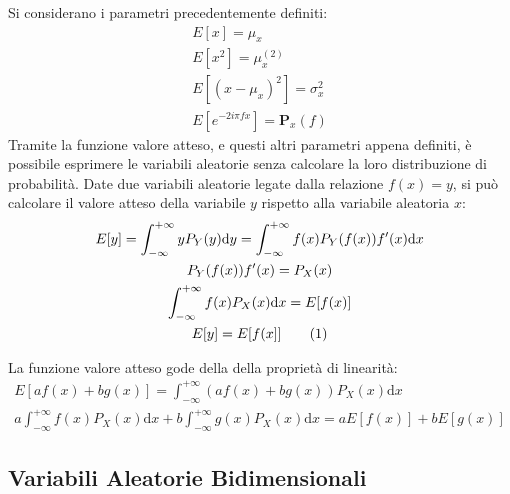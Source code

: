 \documentclass{article}
\newcommand{\df}{\mathrm{d}}
\newcommand{\tageq}{\tag{\stepcounter{equation}\theequation}}
\numberwithin{equation}{subsection}
\begin{document}
Si considerano i parametri precedentemente definiti:
\begin{gather*}
    E[x]=\mu_x\\
    E[x^2]=\mu_x^{(2)}\\
    E[(x-\mu_x)^2]=\sigma_x^2\\
    E\left[e^{-2i\pi fx}\right]=\mathbf{P}_x(f)
\end{gather*}
Tramite la funzione valore atteso, e questi altri parametri appena definiti, è possibile esprimere le variabili aleatorie senza calcolare la loro distribuzione 
di probabilità. Date due variabili aleatorie legate dalla 
relazione $f(x)=y$, si può calcolare il valore atteso della variabile $y$ rispetto alla variabile aleatoria $x$:
\begin{gather*}
    E[y]=\displaystyle\int_{-\infty}^{+\infty}yP_Y(y)\df y=\int_{-\infty}^{+\infty}f(x)P_Y(f(x))f'(x)\df x\\
    P_Y(f(x))f'(x)=P_X(x)\\
    \int_{-\infty}^{+\infty}f(x)P_X(x)\df x=E[f(x)]\\
    E[y]=E[f(x]]\tageq
\end{gather*}

La funzione valore atteso gode della della proprietà di linearità:
\begin{gather}
    E[af(x)+bg(x)]=\displaystyle\int_{-\infty}^{+\infty}(af(x)+bg(x))P_X(x)\df x\\
    a\int_{-\infty}^{+\infty}f(x)P_X(x)\df x+b\int_{-\infty}^{+\infty}g(x)P_X(x)\df x=aE[f(x)]+bE[g(x)]
\end{gather}

\subsection{Variabili Aleatorie Bidimensionali}
\end{document}
